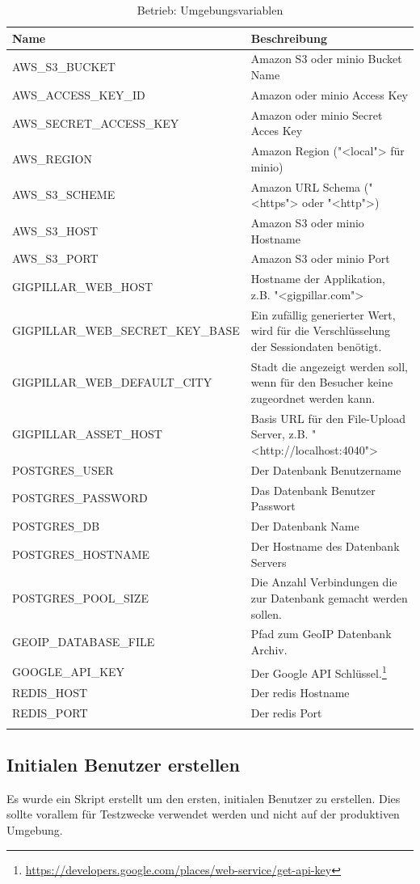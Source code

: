 \begin{longtable}[]{@{}lp{7cm}@{}}
	\toprule
	\textbf{Name}                     & \textbf{Beschreibung}\tabularnewline
	\midrule
	AWS\_S3\_BUCKET                   & Amazon S3 oder minio Bucket Name\tabularnewline
	AWS\_ACCESS\_KEY\_ID              & Amazon oder minio Access Key\tabularnewline
	AWS\_SECRET\_ACCESS\_KEY          & Amazon oder minio Secret Acces Key\tabularnewline
	AWS\_REGION                       & Amazon Region ("<local"> für minio)\tabularnewline
	AWS\_S3\_SCHEME                   & Amazon URL Schema ("<https"> oder "<http">)\tabularnewline
	AWS\_S3\_HOST                     & Amazon S3 oder minio Hostname\tabularnewline
	AWS\_S3\_PORT                     & Amazon S3 oder minio Port\tabularnewline
	GIGPILLAR\_WEB\_HOST              & Hostname der Applikation, z.B. "<gigpillar.com">\tabularnewline
	GIGPILLAR\_WEB\_SECRET\_KEY\_BASE & Ein zufällig generierter Wert, wird für die Verschlüsselung der Sessiondaten benötigt.\tabularnewline
	GIGPILLAR\_WEB\_DEFAULT\_CITY     & Stadt die angezeigt werden soll, wenn für den Besucher keine zugeordnet werden kann.\tabularnewline
	GIGPILLAR\_ASSET\_HOST            & Basis URL für den File-Upload Server, z.B. "<http://localhost:4040">\tabularnewline
	POSTGRES\_USER                    & Der Datenbank Benutzername\tabularnewline
	POSTGRES\_PASSWORD                & Das Datenbank Benutzer Passwort\tabularnewline
	POSTGRES\_DB                      & Der Datenbank Name\tabularnewline
	POSTGRES\_HOSTNAME                & Der Hostname des Datenbank Servers\tabularnewline
	POSTGRES\_POOL\_SIZE              & Die Anzahl Verbindungen die zur Datenbank gemacht werden sollen.\tabularnewline
	GEOIP\_DATABASE\_FILE             & Pfad zum GeoIP Datenbank Archiv.\tabularnewline
	GOOGLE\_API\_KEY                  & Der Google API Schlüssel.\footnote{\url{https://developers.google.com/places/web-service/get-api-key}}\tabularnewline
	REDIS\_HOST                       & Der redis Hostname \tabularnewline
	REDIS\_PORT                       & Der redis Port\tabularnewline
	\bottomrule
	\caption{Betrieb: Umgebungsvariablen}
\end{longtable}

\clearpage
\subsection{Initialen Benutzer erstellen}

Es wurde ein Skript erstellt um den ersten, initialen Benutzer zu erstellen.
Dies sollte vorallem für Testzwecke verwendet werden und nicht auf der
produktiven Umgebung.

